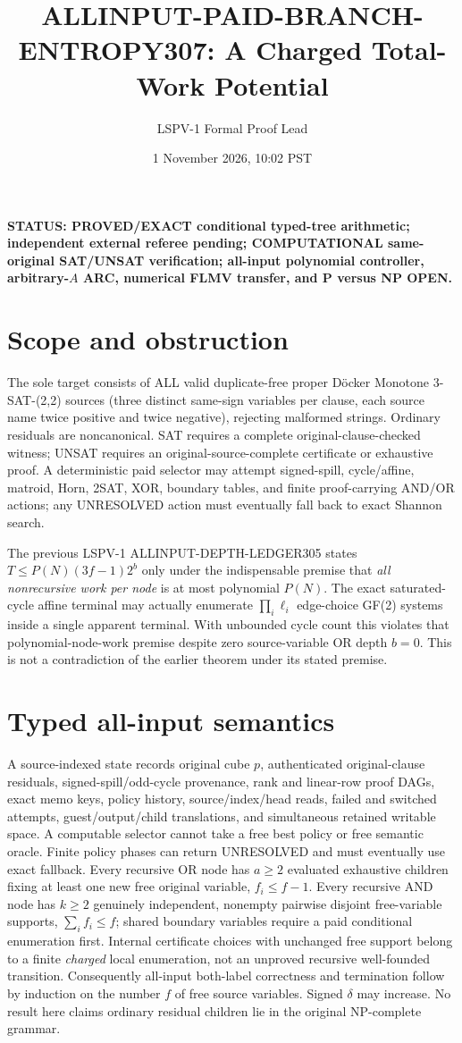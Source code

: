 \documentclass[11pt]{article}
\title{ALLINPUT-PAID-BRANCH-ENTROPY307: A Charged Total-Work Potential}
\author{LSPV-1 Formal Proof Lead}\date{1 November 2026, 10:02 PST}
\begin{document}
\maketitle
\noindent\textbf{STATUS: PROVED/EXACT conditional typed-tree arithmetic; independent external referee pending; COMPUTATIONAL same-original SAT/UNSAT verification; all-input polynomial controller, arbitrary-$A$ ARC, numerical FLMV transfer, and P versus NP OPEN.}

\section{Scope and obstruction}
The sole target consists of ALL valid duplicate-free proper D\"ocker Monotone 3-SAT-(2,2) sources (three distinct same-sign variables per clause, each source name twice positive and twice negative), rejecting malformed strings. Ordinary residuals are noncanonical. SAT requires a complete original-clause-checked witness; UNSAT requires an original-source-complete certificate or exhaustive proof. A deterministic paid selector may attempt signed-spill, cycle/affine, matroid, Horn, 2SAT, XOR, boundary tables, and finite proof-carrying AND/OR actions; any UNRESOLVED action must eventually fall back to exact Shannon search.

The previous LSPV-1 ALLINPUT-DEPTH-LEDGER305 states $T\le P(N)(3f-1)2^b$ only under the indispensable premise that \emph{all nonrecursive work per node} is at most polynomial $P(N)$. The exact saturated-cycle affine terminal may actually enumerate $\prod_i\ell_i$ edge-choice GF(2) systems inside a single apparent terminal. With unbounded cycle count this violates that polynomial-node-work premise despite zero source-variable OR depth $b=0$. This is not a contradiction of the earlier theorem under its stated premise.

\section{Typed all-input semantics}
A source-indexed state records original cube $p$, authenticated original-clause residuals, signed-spill/odd-cycle provenance, rank and linear-row proof DAGs, exact memo keys, policy history, source/index/head reads, failed and switched attempts, guest/output/child translations, and simultaneous retained writable space. A computable selector cannot take a free best policy or free semantic oracle. Finite policy phases can return UNRESOLVED and must eventually use exact fallback. Every recursive OR node has $a\ge2$ evaluated exhaustive children fixing at least one new free original variable, $f_i\le f-1$. Every recursive AND node has $k\ge2$ genuinely independent, nonempty pairwise disjoint free-variable supports, $\sum_i f_i\le f$; shared boundary variables require a paid conditional enumeration first. Internal certificate choices with unchanged free support belong to a finite \emph{charged} local enumeration, not an unproved recursive well-founded transition. Consequently all-input both-label correctness and termination follow by induction on the number $f$ of free source variables. Signed $\delta$ may increase. No result here claims ordinary residual children lie in the original NP-complete grammar.
\end{document}
